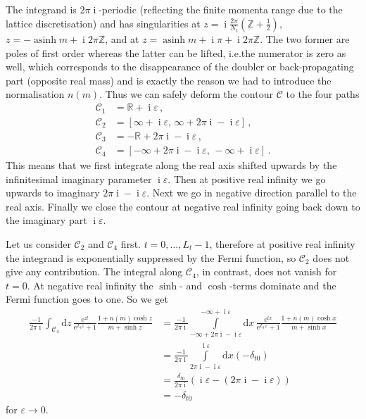 \documentclass[a4paper]{article}
\DeclareMathOperator{\im}{i}
\DeclareMathOperator{\asinh}{asinh}
\newcommand{\eto}[1]{\ensuremath{\mathrm{e}^{#1}}}
\newcommand{\md}{\ensuremath{\mathrm{d}}}
\begin{document}
	The integrand is $2\pi \im$-periodic (reflecting the finite momenta range due to the lattice discretisation) and has singularities at $z=\im\frac{2\pi}{N_t}\left(\mathbb Z+\frac 12\right)$, $z=-\asinh m + \im 2\pi \mathbb Z$, and at $z=\asinh m + \im \pi + \im 2\pi \mathbb Z$. The two former are poles of first order whereas the latter can be lifted, i.e.\@ the numerator is zero as well, which corresponds to the disappearance of the doubler or back-propagating part (opposite real mass) and is exactly the reason we had to introduce the normalisation $n(m)$. Thus we can safely deform the contour $\mathcal{C}$ to the four paths
	\begin{align}
	\mathcal{C}_1&=\mathbb{R}+\im \varepsilon\,,\\
	\mathcal{C}_2&=\left[\infty+\im\varepsilon,\,\infty+2\pi\im-\im\varepsilon\right]\,,\\
	\mathcal{C}_3&=-\mathbb{R}+2\pi\im-\im \varepsilon\,,\\
	\mathcal{C}_4&=\left[-\infty+2\pi\im-\im\varepsilon,\,-\infty+\im\varepsilon\right]\,.
	\end{align}
	This means that we first integrate along the real axis shifted upwards by the infinitesimal imaginary parameter $\im\varepsilon$. Then at positive real infinity we go upwards to imaginary $2\pi\im-\im\varepsilon$. Next we go in negative direction parallel to the real axis. Finally we close the contour at negative real infinity going back down to the imaginary part $\im\varepsilon$.
	
	Let us consider $\mathcal{C}_2$ and $\mathcal{C}_4$ first. $t=0,\dots,L_t-1$, therefore at positive real infinity the integrand is exponentially suppressed by the Fermi function, so $\mathcal{C}_2$ does not give any contribution. The integral along $\mathcal{C}_4$, in contrast, does not vanish for $t=0$. At negative real infinity the $\sinh$- and $\cosh$-terms dominate and the Fermi function goes to one. So we get
	\begin{align}
	\frac{-1}{2\pi\im}\int_{\mathcal{C}_4}\md z\, \frac{\eto{z t}}{\eto{L_t z}+1}\frac{1+n(m)\cosh z}{m+\sinh z}
	&=\frac{-1}{2\pi\im}\int\limits_{-\infty+2\pi\im-\im\varepsilon}^{-\infty+\im\varepsilon}\md x\, \frac{\eto{t x}}{\eto{L_t x}+1}\frac{1+n(m)\cosh x}{m+\sinh x}\\
	&=\frac{-1}{2\pi\im}\int\limits_{2\pi\im-\im\varepsilon}^{\im\varepsilon}\md x \left(-\delta_{t0}\right)\\
	&=\frac{\delta_{t0}}{2\pi\im}\left(\im\varepsilon-\left(2\pi\im-\im\varepsilon\right)\right)\\
	&=-\delta_{t0}
	\end{align}
	for $\varepsilon\rightarrow 0$.
	
\end{document}
